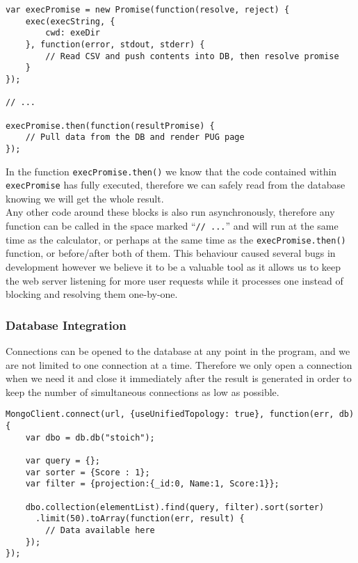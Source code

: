 \begin{verbatim}
var execPromise = new Promise(function(resolve, reject) {
    exec(execString, {
        cwd: exeDir
    }, function(error, stdout, stderr) {
        // Read CSV and push contents into DB, then resolve promise
    }
});

// ... 

execPromise.then(function(resultPromise) { 
    // Pull data from the DB and render PUG page
});
\end{verbatim}

In the function \texttt{execPromise.then()} we know that the code contained within \texttt{execPromise} has fully executed, therefore we can safely read from the database knowing we will get the whole result. \\ 

Any other code around these blocks is also run asynchronously, therefore any function can be called in the space marked ``\texttt{// ...}'' and will run at the same time as the calculator, or perhaps at the same time as the \texttt{execPromise.then()} function, or before/after both of them. This behaviour caused several bugs in development however we believe it to be a valuable tool as it allows us to keep the web server listening for more user requests while it processes one instead of blocking and resolving them one-by-one.

\subsubsection{Database Integration}
Connections can be opened to the database at any point in the program, and we are not limited to one connection at a time. Therefore we only open a connection when we need it and close it immediately after the result is generated in order to keep the number of simultaneous connections as low as possible. 

\begin{verbatim}
MongoClient.connect(url, {useUnifiedTopology: true}, function(err, db) {
    var dbo = db.db("stoich");
	
    var query = {};
    var sorter = {Score : 1};
    var filter = {projection:{_id:0, Name:1, Score:1}};

    dbo.collection(elementList).find(query, filter).sort(sorter)
      .limit(50).toArray(function(err, result) {
        // Data available here
    });
});
\end{verbatim}

